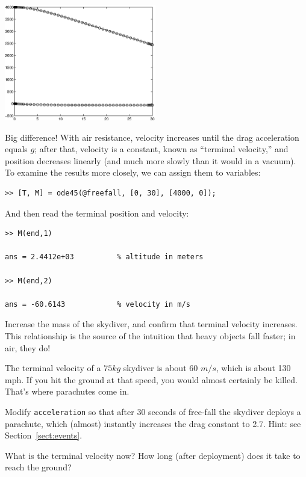 \documentclass[
]{book}
\begin{document}
\beforefig \centerline{\includegraphics[height=2in]{figs/freefall2.eps}}

Big difference!  With air resistance, velocity increases until
the drag acceleration equals $g$; after that, velocity is a constant,
known as ``terminal velocity,'' and position decreases linearly
(and much more slowly than it would in a vacuum).  To examine
the results more closely, we can assign them to variables:


\begin{verbatim}
>> [T, M] = ode45(@freefall, [0, 30], [4000, 0]);
\end{verbatim}

And then read the terminal position and velocity:

\begin{verbatim}
>> M(end,1)

ans = 2.4412e+03          % altitude in meters

>> M(end,2)

ans = -60.6143            % velocity in m/s
\end{verbatim}

\begin{ex}
Increase the mass of the skydiver, and confirm that
terminal velocity increases.  This relationship is the source of the
intuition that heavy objects fall faster; in air, they do!
\end{ex}

\begin{ex}
The terminal velocity of a $75
kg$ skydiver is about 60 $m/s$, which is about 130 mph.  If you hit
the ground at that speed, you would almost certainly be killed.
That's where parachutes come in.

Modify {\tt acceleration} so that after 30 seconds of
free-fall the skydiver deploys a parachute, which (almost) instantly
    increases the drag constant to 2.7. Hint: see Section~\ref{sect:events}.

What is the terminal velocity now?  How long (after deployment) does
it take to reach the ground?
\end{ex}
\end{document}
